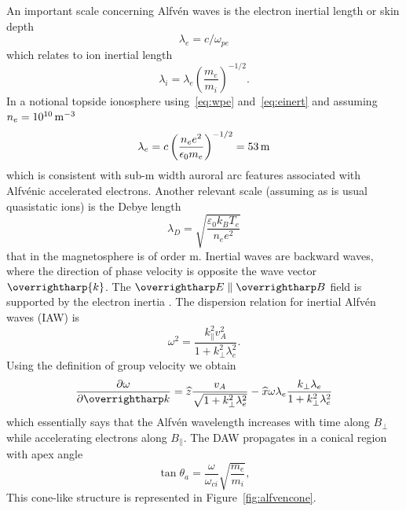 An important scale concerning Alfvén waves is the electron inertial length or skin depth \citep{paschmann2003}
\begin{equation}\label{eq:einert}
\lambda_e = c/\omega_{pe}
\end{equation}
which relates to ion inertial length
\begin{equation}
\lambda_i = \lambda_e \left(\frac{m_e}{m_i}\right)^{-1/2}.
\end{equation}
In a notional topside ionosphere using~\eqref{eq:wpe} and~\eqref{eq:einert} and assuming $n_e = \unit[10^{10}]{m^{-3}}$
\begin{equation}
\lambda_e = c \left( \frac{n_e e^2}{\epsilon_0 m_e} \right)^{-1/2} = \unit[53]{m}
\end{equation}
which is consistent with sub-\unit[100]{m} width auroral arc features associated with Alfvénic accelerated electrons.
Another relevant scale (assuming as is usual quasistatic ions) is the Debye length \citep{langmuir1928}
\begin{equation}
\lambda _{D}={\sqrt {\frac {\varepsilon_0 k_B T_e}{n_e e^{2}}}}
\end{equation}
that in the magnetosphere is of order \unit[100]{m}.
Inertial waves are backward waves, where the direction of phase velocity is opposite the wave vector $\overrightharp{k}$.
The $\vect{E} \parallel \vect{B}$ field is supported by the electron inertia \citep{stasiewicz2000}.
The dispersion relation for inertial Alfvén waves (IAW) is \citep{stasiewicz2000}
\begin{equation}\label{eq:dispiaw}
\omega^2 = \frac{k^2_\parallel v^2_A}{1+k^2_\perp \lambda^2_e}.
\end{equation}
Using the definition of group velocity we obtain \citep{stasiewicz2000}
\begin{equation}
\frac{\partial \omega}{\partial \vect{k}} = \widehat{z} \frac{v_A}{\sqrt{1+k^2_\perp \lambda_e^2}} - \widehat{x} \omega \lambda_e \frac{k_\perp \lambda_e}{1+k^2_\perp \lambda_e^2}
\end{equation}
which essentially says that the Alfvén wavelength increases with time along $B_\perp$ while accelerating electrons along $B_\parallel$.
The DAW propagates in a conical region with apex angle \citep{semeter2008}
\begin{equation}
\tan \theta_a = \frac{\omega}{\omega_{ci}} \sqrt{\frac{m_e}{m_i}},
\end{equation}
This cone-like structure is represented in Figure~\ref{fig:alfvencone}.
